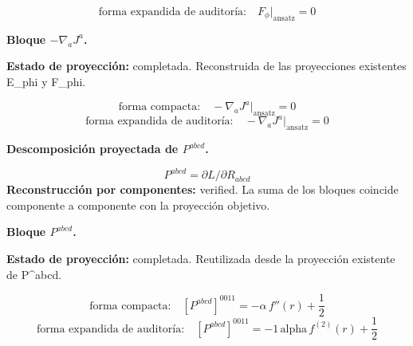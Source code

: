 \documentclass[11pt]{article}
\begin{document}
\begin{dmath*}[breakdepth={5}]
\text{forma expandida de auditoría:}\quad F_{\phi}\big|_{\mathrm{ansatz}} = 0
\end{dmath*}
\par\smallskip\noindent\textbf{Bloque $ -\nabla_a J^a $.}\par
\textbf{Estado de proyección:} completada. Reconstruida de las proyecciones existentes E\_phi y F\_phi.\par
\begin{dmath*}[breakdepth={5}]
\text{forma compacta:}\quad -\nabla_a J^a\big|_{\mathrm{ansatz}} = 0
\end{dmath*}
\begin{dmath*}[breakdepth={5}]
\text{forma expandida de auditoría:}\quad -\nabla_a J^a\big|_{\mathrm{ansatz}} = 0
\end{dmath*}
\par\medskip\noindent\textbf{Descomposición proyectada de $ P^{abcd} $.}\par
\begin{dmath*}[breakdepth={5}]
P^{abcd}=\partial L/\partial R_{abcd}
\end{dmath*}
\textbf{Reconstrucción por componentes:} verified. La suma de los bloques coincide componente a componente con la proyección objetivo.\par
\par\smallskip\noindent\textbf{Bloque $ P^{abcd} $.}\par
\textbf{Estado de proyección:} completada. Reutilizada desde la proyección existente de P^{abcd}.\par
\begin{dmath*}[breakdepth={5}]
\text{forma compacta:}\quad \left[P^{abcd}\right]^{0011} = -\alpha\,f''\!\left(r\right) + \frac{1}{2}
\end{dmath*}
\begin{dmath*}[breakdepth={5}]
\text{forma expandida de auditoría:}\quad \left[P^{abcd}\right]^{0011} = -1\,\mathrm{alpha}\,f^{(2)}\!\left(r\right) + \frac{1}{2}
\end{dmath*}
\end{document}
